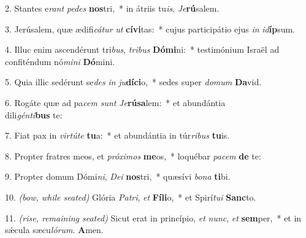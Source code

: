 2. Stantes e\textit{rant} \textit{pe}\textit{des} \textbf{nos}tri,~* in átriis tu\textit{is}, \textit{Je}\textbf{rú}salem.

3. Jerúsalem, quæ ædifi\textit{cá}\textit{tur} \textit{ut} \textbf{cí}\textbf{vi}tas:~* cujus participátio ejus \textit{in} \textit{id}\textbf{íp}sum.

4. Illuc enim ascendérunt tri\textit{bus}, \textit{tri}\textit{bus} \textbf{Dó}\textbf{mi}ni:~* testimónium Israël ad confiténdum nó\textit{mi}\textit{ni} \textbf{Dó}mini.

5. Quia illic sedérunt se\textit{des} \textit{in} \textit{ju}\textbf{dí}\textbf{ci}o,~* sedes super \textit{do}\textit{mum} \textbf{Da}vid.

6. Rogáte quæ ad pa\textit{cem} \textit{sunt} \textit{Je}\textbf{rú}\textbf{sa}lem:~* et abundántia\\ dili\textit{gén}\textit{ti}\textbf{bus} te:

7. Fiat pax in \textit{vir}\textit{tú}\textit{te} \textbf{tu}a:~* et abundántia in túr\textit{ri}\textit{bus} \textbf{tu}is.

8. Propter fratres meos, et \textit{pró}\textit{xi}\textit{mos} \textbf{me}os,~* loquébar \textit{pa}\textit{cem} \textbf{de} te:

9. Propter domum Dómi\textit{ni}, \textit{De}\textit{i} \textbf{nos}tri,~* quæsívi \textit{bo}\textit{na} \textbf{ti}bi.

10. {\color{red}\textit{(bow, while seated)}} Glória \textit{Pa}\textit{tri}, \textit{et} \textbf{Fí}\textbf{li}o,~* et Spirí\textit{tu}\textit{i} \textbf{Sanc}to.

11. {\color{red}\textit{(rise, remaining seated)}} Sicut erat in princípio, \textit{et} \textit{nunc}, \textit{et} \textbf{sem}per,~* et in s\'{\ae}cula sæcu\textit{ló}\textit{rum}. \textbf{A}men.
